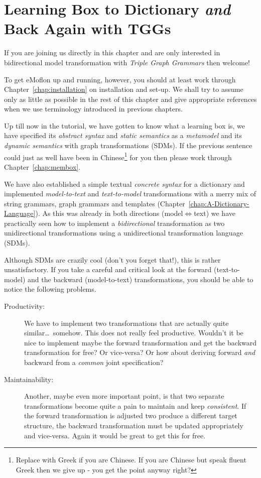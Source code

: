 \chapter{Learning Box to Dictionary \emph{and} Back Again with TGGs}
\label{Learning-Box-to-Dictionary-and-Back-Again}

If you are joining us directly in this chapter and are only interested in bidirectional model transformation with \emph{Triple Graph Grammars} then welcome!

To get eMoflon up and running, however, you should at least work through Chapter~\ref{chap:installation} on installation and set-up.
We shall try to assume only as little as possible in the rest of this chapter and give appropriate references when we use terminology introduced in previous chapters.

Up till now in the tutorial, we have gotten to know what a learning box is, we have specified its \emph{abstract syntax} and \emph{static semantics} as a \emph{metamodel} and its \emph{dynamic semantics} with graph transformations (SDMs).
If the previous sentence could just as well have been in Chinese\footnote{Replace with Greek if you are Chinese.  If you are Chinese but speak fluent Greek then we give up - you get the point anyway right?} for you then please work through Chapter~\ref{chap:membox}.

We have also established a simple textual \emph{concrete syntax} for a dictionary and implemented \emph{model-to-text} and \emph{text-to-model} transformations with a merry mix of string grammars, graph grammars and templates (Chapter~\ref{chap:A-Dictionary-Language}).
As this was already in both directions (model$\Leftrightarrow$text) we have practically seen how to implement a \emph{bidirectional} transformation as two unidirectional transformations using a unidirectional transformation language (SDMs).

Although SDMs are crazily cool (don't you forget that!), this is rather unsatisfactory.  
If you take a careful and critical look at the forward (text-to-model) and the backward (model-to-text) transformations, you should be able to notice the following problems.
\begin{description}
  \item[Productivity:] We have to implement two transformations that are actually quite similar\ldots ~somehow.  This does not really feel productive.  Wouldn't it be nice to implement maybe the forward transformation and get the backward transformation for free?  Or vice-versa?  Or how about deriving forward \emph{and} backward from a \emph{common} joint specification?
  \item[Maintainability:] Another, maybe even more important point, is that two separate transformations become quite a pain to maintain and keep \emph{consistent}.  If the forward transformation is adjusted two produce a different target structure, the backward transformation must be updated appropriately and vice-versa.  Again it would be great to get this for free. 
\end{description}

